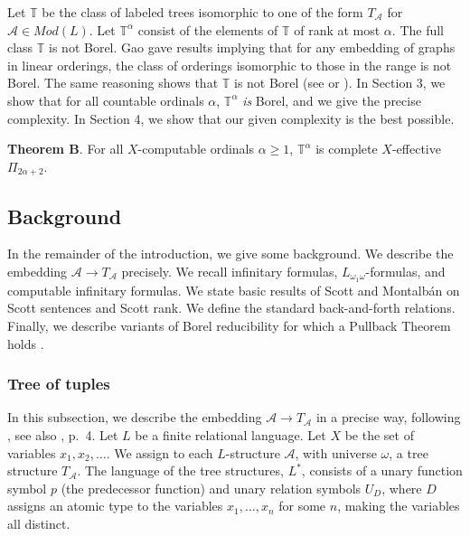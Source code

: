 \documentclass{article}
\begin{document}
\bigskip

Let $\mathbb{T}$ be the class of labeled trees isomorphic to one of the form $T_\mathcal{A}$ for $\mathcal{A}\in Mod(L)$.  Let $\mathbb{T}^\alpha$ consist of the elements of $\mathbb{T}$ of rank at most $\alpha$.  The full class $\mathbb{T}$ is not Borel.  Gao \cite{gao} gave results implying that for any embedding of graphs in linear orderings, the class of orderings isomorphic to those in the range is not Borel.  The same reasoning shows that $\mathbb{T}$ is not Borel (see \cite{GR} or \cite{GHT}).  In Section 3, we show that for all countable ordinals $\alpha$, $\mathbb{T}^\alpha$ \emph{is} Borel, and we give the precise complexity. In Section 4, we show that our given complexity is the best possible.

\bigskip
\noindent
\textbf{Theorem B}.  For all $X$-computable ordinals $\alpha\geq 1$, $\mathbb{T}^\alpha$ is complete $X$-effective $\Pi_{2\alpha+2}$.  

\subsection{Background}

In the remainder of the introduction, we give some background.  We describe the embedding $\mathcal{A}\rightarrow T_\mathcal{A}$ precisely.  We recall infinitary formulas, $L_{\omega_1\omega}$-formulas, and computable infinitary formulas.  We state basic results of Scott \cite{S} and Montalb\'{a}n \cite{robuster} on Scott sentences and Scott rank.  We define the standard back-and-forth relations.  Finally, we describe variants of Borel reducibility for which a Pullback Theorem holds \cite{KMV}.   

\subsubsection{Tree of tuples} 

In this subsection, we describe the embedding $\mathcal{A}\rightarrow T_\mathcal{A}$ in a precise way, following \cite{H-TM}, see also \cite{GR}, p.\ 4.  Let $L$ be a finite relational language.  Let $X$ be the set of variables $x_1,x_2,\ldots$.  We assign to each $L$-structure $\mathcal{A}$, with universe $\omega$, a tree structure $T_\mathcal{A}$.  The language of the tree structures, $L^*$, consists of a unary function symbol $p$ (the predecessor function) and unary relation symbols $U_D$, where $D$ assigns an atomic type to the variables $x_1,\ldots,x_n$ for some $n$, making the variables all distinct.    
\end{document}
